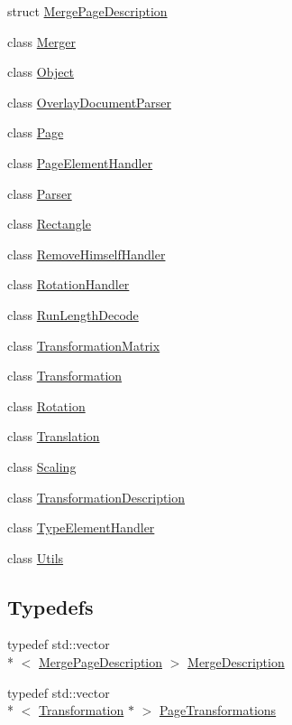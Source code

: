 \begin{DoxyCompactItemize}
\item 
struct \hyperlink{structmerge__lib_1_1_merge_page_description}{Merge\-Page\-Description}
\item 
class \hyperlink{classmerge__lib_1_1_merger}{Merger}
\item 
class \hyperlink{classmerge__lib_1_1_object}{Object}
\item 
class \hyperlink{classmerge__lib_1_1_overlay_document_parser}{Overlay\-Document\-Parser}
\item 
class \hyperlink{classmerge__lib_1_1_page}{Page}
\item 
class \hyperlink{classmerge__lib_1_1_page_element_handler}{Page\-Element\-Handler}
\item 
class \hyperlink{classmerge__lib_1_1_parser}{Parser}
\item 
class \hyperlink{classmerge__lib_1_1_rectangle}{Rectangle}
\item 
class \hyperlink{classmerge__lib_1_1_remove_himself_handler}{Remove\-Himself\-Handler}
\item 
class \hyperlink{classmerge__lib_1_1_rotation_handler}{Rotation\-Handler}
\item 
class \hyperlink{classmerge__lib_1_1_run_length_decode}{Run\-Length\-Decode}
\item 
class \hyperlink{classmerge__lib_1_1_transformation_matrix}{Transformation\-Matrix}
\item 
class \hyperlink{classmerge__lib_1_1_transformation}{Transformation}
\item 
class \hyperlink{classmerge__lib_1_1_rotation}{Rotation}
\item 
class \hyperlink{classmerge__lib_1_1_translation}{Translation}
\item 
class \hyperlink{classmerge__lib_1_1_scaling}{Scaling}
\item 
class \hyperlink{classmerge__lib_1_1_transformation_description}{Transformation\-Description}
\item 
class \hyperlink{classmerge__lib_1_1_type_element_handler}{Type\-Element\-Handler}
\item 
class \hyperlink{classmerge__lib_1_1_utils}{Utils}
\end{DoxyCompactItemize}
\subsection*{Typedefs}
\begin{DoxyCompactItemize}
\item 
typedef std\-::vector\\*
$<$ \hyperlink{structmerge__lib_1_1_merge_page_description}{Merge\-Page\-Description} $>$ \hyperlink{namespacemerge__lib_a0a9efd2f197f07a92f4879b230a2e0b2}{Merge\-Description}
\item 
typedef std\-::vector\\*
$<$ \hyperlink{classmerge__lib_1_1_transformation}{Transformation} $\ast$ $>$ \hyperlink{namespacemerge__lib_abbc56c33e072a8c7b4494d50942a06a4}{Page\-Transformations}
\end{DoxyCompactItemize}


